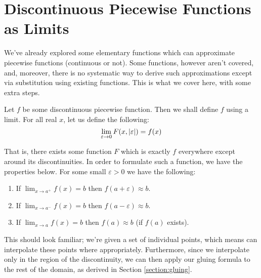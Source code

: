 \chapter{Discontinuous Piecewise Functions as Limits}
We've already explored some elementary functions which can approximate piecewise functions (continuous or not). Some functions, however aren't covered, and, moreover, there is no systematic way to derive such approximations except via substitution using existing functions. This is what we cover here, with some extra steps.

Let $f$ be some discontinuous piecewise function. Then we shall define $f$ using a limit. For all real $x$, let us define the following:
$$
    \lim_{\varepsilon\to0}{F(x,\abs{\varepsilon})}=f(x)
$$

That is, there exists some function $F$ which is exactly $f$ everywhere except around its discontinuities. In order to formulate such a function, we have the properties below. For some small $\varepsilon>0$ we have the following:

\begin{enumerate}
    \item If $\lim_{x\to a^+}{f(x)}=b$ then $f(a+\varepsilon)\approx b$.
    \item If $\lim_{x\to a^-}{f(x)}=b$ then $f(a-\varepsilon)\approx b$.
    \item If $\lim_{x\to a}{f(x)}=b$ then $f(a)\approx b$ (if $f(a)$ exists).
\end{enumerate}

This should look familiar; we're given a set of individual points, which means can interpolate these points where appropriately. Furthermore, since we interpolate only in the region of the discontinuity, we can then apply our gluing formula to the rest of the domain, as derived in Section \ref{section:gluing}.

